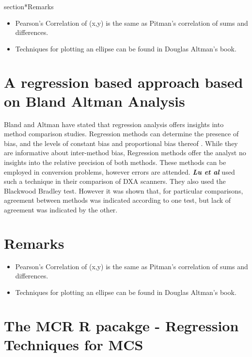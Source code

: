 \documentclass[12pt, a4paper]{report}
\theoremstyle{plain}
\theoremstyle{definition}
\theoremstyle{remark}
\begin{document}
section*{Remarks}
\begin{itemize}
	\item Pearson's Correlation of (x,y) is the same as Pitman's correlation of sums and differences.
	
	\item Techniques for plotting an ellipse can be found in Douglas Altman's book.
\end{itemize}
\newpage



\section{A regression based approach based on Bland Altman Analysis}
Bland and Altman have stated that regression analysis offers insights into method comparison studies. Regression methods can determine the presence of bias, and the levels of constant bias and proportional bias thereof \cite{ludbrook97,ludbrook02}.
While they are informative about inter-method bias, Regression methods offer the analyst no insights into the relative precision of both methods. These methods can be employed in conversion problems, however errors are
attended.
\emph{\textbf{Lu et al}} used such a technique in their comparison of DXA scanners. They also used the Blackwood Bradley test. However it was shown that, for particular comparisons, agreement between methods was indicated according to one test, but lack of agreement was indicated by the other.


\section*{Remarks}
\begin{itemize}
	\item Pearson's Correlation of (x,y) is the same as Pitman's correlation of sums and differences.
	
	\item Techniques for plotting an ellipse can be found in Douglas Altman's book.
\end{itemize}

\section{The MCR R pacakge - Regression Techniques for MCS}
\end{document}

